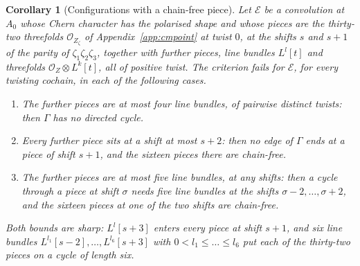 \documentclass[11pt,reqno]{amsart}
\numberwithin{equation}{section}
\theoremstyle{plain}
\newtheorem{corollary}[theorem]{Corollary}
\theoremstyle{definition}
\begin{document}
\begin{corollary}[Configurations with a chain-free piece]\label{cor:chainfree}
Let $\mathcal{E}$ be a convolution at $A_{0}$ whose Chern character has the polarised shape and whose pieces are the thirty-two threefolds $\mathcal{O}_{Z_{\zeta}}$ of Appendix~\ref{app:cmpoint} at twist $0$, at the shifts $s$ and $s+1$ of the parity of $\zeta_{1}\zeta_{2}\zeta_{3}$, together with further pieces, line bundles $L^{l}[t]$ and threefolds $\mathcal{O}_{Z}\otimes L^{k}[t]$, all of positive twist. The criterion fails for $\mathcal{E}$, for every twisting cochain, in each of the following cases.
\begin{enumerate}[label=\textup{(\roman*)},leftmargin=2.4em,itemsep=2pt]
\item The further pieces are at most four line bundles, of pairwise distinct twists: then $\Gamma$ has no directed cycle.
\item Every further piece sits at a shift at most $s+2$: then no edge of $\Gamma$ ends at a piece of shift $s+1$, and the sixteen pieces there are chain-free.
\item The further pieces are at most five line bundles, at any shifts: then a cycle through a piece at shift $\sigma$ needs five line bundles at the shifts $\sigma-2,\dots,\sigma+2$, and the sixteen pieces at one of the two shifts are chain-free.
\end{enumerate}
Both bounds are sharp: $L^{l}[s+3]$ enters every piece at shift $s+1$, and six line bundles $L^{l_{1}}[s-2],\dots,L^{l_{6}}[s+3]$ with $0<l_{1}\le\dots\le l_{6}$ put each of the thirty-two pieces on a cycle of length six.
\end{corollary}
\end{document}

